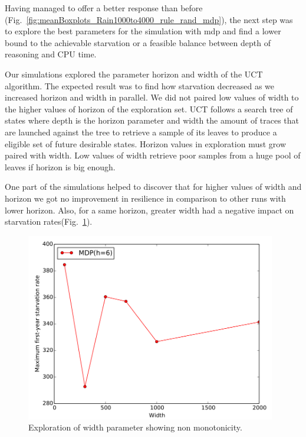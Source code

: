 \documentclass[11pt,oneside,a4paper,openright]{report}
\begin{document}

Having managed to offer a better response than before (Fig.~\ref{fig:meanBoxplots_Rain1000to4000_rule_rand_mdp}), 
the next step was to explore the best parameters for the simulation with mdp and find a lower bound to the 
achievable starvation or a feasible balance between depth of reasoning and CPU time.

Our simulations explored the parameter horizon and width of the UCT algorithm\cite{BonetGeffner2012}. The expected 
result was to find how starvation decreased as we increased horizon and width in parallel. We did not paired
low values of width to the higher values of horizon of the exploration set. UCT follows a search tree of 
states where depth is the horizon parameter and width the amount of traces that are launched against the tree 
to retrieve a sample of its leaves to produce a eligible set of future desirable states. Horizon values in
exploration must grow paired with width. Low values of width retrieve poor samples from a huge pool of leaves 
if horizon is big enough. 


One part of the simulations helped to discover that for higher values of width and horizon we got no 
improvement in resilience in comparison to other runs with lower horizon. Also, for a same horizon, greater
width had a negative impact on starvation rates(Fig.~\ref{fig:widthsNonMonotonic}).


\begin{figure}[!htb]
\centering
\includegraphics[height=8.2cm]{figures/expm/widths}
\caption{Exploration of width parameter showing non monotonicity.}
\label{fig:widthsNonMonotonic}
\end{figure}
\end{document}
